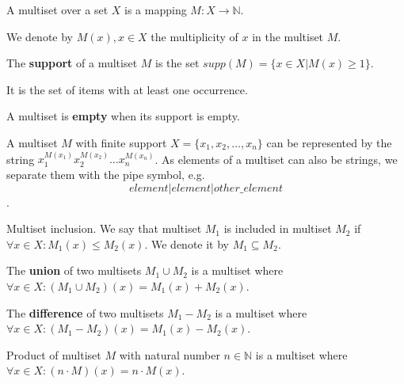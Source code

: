 \begin{definition}
A multiset over a set $X$ is a mapping $M: X\rightarrow \mathbb N$.
\end{definition}

We denote by $M(x), x\in X$ the multiplicity of $x$ in the multiset $M$.

\begin{definition}
The {\bf support} of a multiset $M$ is the set $supp(M)=\{x\in X|M(x)\geq 1\}$.
\end{definition}

It is the set of items with at least one occurrence.

\begin{definition}
A multiset is {\bf empty} when its support is empty.
\end{definition}

A multiset $M$ with finite support $X = \{x_1, x_2, \ldots, x_n\}$ can be represented by the string $x_1^{M(x_1)}x_2^{M(x_2)}\ldots x_n^{M(x_n)}$.
As elements of a multiset can also be strings, we separate them with the pipe symbol, e.g. $$element|element|other\_element$$.

\begin{definition}
Multiset inclusion. We say that multiset $M_1$ is included in multiset $M_2$ if $\forall x \in X: M_1(x)\leq M_2(x)$. We denote it by $M_1\subseteq M_2$.
\end{definition}

\begin{definition}
The {\bf union} of two multisets $M_1\cup M_2$ is a multiset where $\forall x \in X: (M_1\cup M_2)(x)=M_1(x)+M_2(x)$.
\end{definition}

\begin{definition}
The {\bf difference} of two multisets $M_1-M_2$ is a multiset where $\forall x \in X: (M_1-M_2)(x)=M_1(x)-M_2(x)$.
\end{definition}

\begin{definition}
Product of multiset $M$ with natural number $n\in \mathbb N$ is a multiset where $\forall x \in X: (n\cdot M)(x)=n\cdot M(x)$.  
\end{definition}
